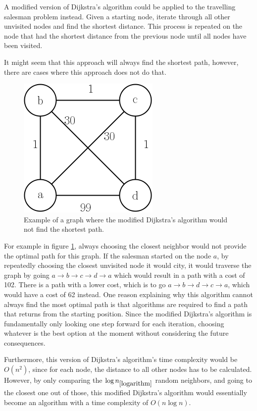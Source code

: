 \documentclass{article}
\begin{document}
\noindent
A modified version of Dijkstra's algorithm could be applied to the travelling salesman problem instead. Given a starting node, iterate through all other unvisited nodes and find the shortest distance. This process is repeated on the node that had the shortest distance from the previous node until all nodes have been visited. 

\noindent
It might seem that this approach will always find the shortest path, however, there are cases where this approach does not do that. 

\begin{figure}[ht]
     \centering
     \includegraphics[scale=0.5]{docs/pictures/dijkstras.png}
     \caption{Example of a graph where the modified Dijkstra's algorithm would not find the shortest path.}
     \label{Figure:CounterExampleDijkstras}
\end{figure}
\noindent
For example in figure \ref{Figure:CounterExampleDijkstras}, always choosing the closest neighbor would not provide the optimal path for this graph. If the salesman started on the node $a$, by repeatedly choosing the closest unvisited node it would city, it would traverse the graph by going $a \rightarrow b \rightarrow c \rightarrow d \rightarrow a$ which would result in a path with a cost of 102. There is a path with a lower cost, which is to go $a \rightarrow b \rightarrow d \rightarrow c \rightarrow a$, which would have a cost of 62 instead. One reason explaining why this algorithm cannot always find the most optimal path is that algorithms are required to find a path that returns from the starting position. Since the modified Dijkstra's algorithm is fundamentally only looking one step forward for each iteration, choosing whatever is the best option at the moment without considering the future consequences.

\noindent
Furthermore, this version of Dijkstra's algorithm's time complexity would be $O(n^2)$, since for each node, the distance to all other nodes has to be calculated. However, by only comparing the $\log{n}_{\ref{logarithm}}$ random neighbors, and going to the closest one out of those, this modified Dijkstra's algorithm would essentially become an algorithm with a time complexity of $O(n \log{n})$. 
\end{document}
